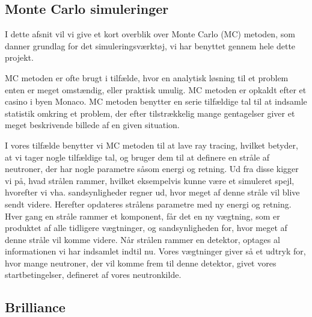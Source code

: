 \documentclass[12pt,oneside,a4paper]{article}
\begin{document}
{{{{{\subsection{Monte Carlo simuleringer}
I dette afsnit vil vi give et kort overblik over Monte Carlo (MC) metoden, som danner grundlag for det simuleringsværktøj, vi har benyttet gennem hele dette projekt.

MC metoden er ofte brugt i tilfælde, hvor en analytisk løsning til et problem enten er meget omstændig, eller praktisk umulig. MC metoden er opkaldt efter et casino i byen Monaco. MC metoden benytter en serie tilfældige tal til at indsamle statistik omkring et problem, der efter tilstrækkelig mange gentagelser giver et meget beskrivende billede af en given situation.

I vores tilfælde benytter vi MC metoden til at lave ray tracing, hvilket betyder, at vi tager nogle tilfældige tal, og bruger dem til at definere en stråle af neutroner, der har nogle parametre såsom energi og retning.
Ud fra disse  kigger vi på, hvad strålen rammer, hvilket eksempelvis kunne være et simuleret spejl, hvorefter vi vha. sandsynligheder regner ud, hvor meget af denne stråle vil blive sendt videre. Herefter opdateres strålens parametre med ny energi og retning.
Hver gang en stråle rammer et komponent, får det en ny vægtning, som er produktet af alle tidligere vægtninger, og sandsynligheden for, hvor meget af denne stråle vil komme videre.
Når strålen rammer en detektor, optages al informationen vi har indsamlet indtil nu. Vores vægtninger giver så et udtryk for, hvor mange neutroner, der vil komme frem til denne detektor, givet vores startbetingelser, defineret af vores neutronkilde. \cite{wiki:monte_carlo}

\subsection{Brilliance}

}}}}}
\end{document}
